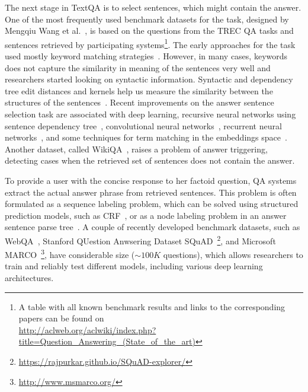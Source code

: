 The next stage in TextQA is to select sentences, which might contain the answer.
One of the most frequently used benchmark datasets for the task, designed by Mengqiu Wang et al.~\cite{wang2007jeopardy}, is based on the questions from the TREC QA tasks and sentences retrieved by participating systems\footnote{A table with all known benchmark results and links to the corresponding papers can be found on\\ \href{url}{http://aclweb.org/aclwiki/index.php?title=Question\_Answering\_(State\_of\_the\_art)}}.
The early approaches for the task used mostly keyword matching strategies~\cite{ittycheriah2001ibm,soubbotin2001patterns}.
However, in many cases, keywords does not capture the similarity in meaning of the sentences very well and researchers started looking on syntactic information.
Syntactic and dependency tree edit distances and kernels help us measure the similarity between the structures of the sentences~\cite{heilman2010tree,punyakanok2004mapping,shen2005exploring,wang2010probabilistic,yao2013answer}.
Recent improvements on the answer sentence selection task are associated with deep learning, \eg recursive neural networks using sentence dependency tree~\cite{iyyer2014neural}, convolutional neural networks~\cite{yu2014deep,santos2016attentive}, recurrent neural networks~\cite{tan2015lstm,WangN15}, and some techniques for term matching in the embeddings space~\cite{he2016pairwise,yang2016anmm,wang2017bilateral}.
Another dataset, called WikiQA~\cite{yang2015wikiqa}, raises a problem of answer triggering, \ie detecting cases when the retrieved set of sentences does not contain the answer.

To provide a user with the concise response to her factoid question, QA systems extract the actual answer phrase from retrieved sentences.
This problem is often formulated as a sequence labeling problem, which can be solved using structured prediction models, such as CRF~\cite{yao2013answer}, or as a node labeling problem in an answer sentence parse tree~\cite{malon2013answer}.
A couple of recently developed benchmark datasets, such as WebQA~\cite{li2016dataset}, Stanford QUestion Anwsering Dataset SQuAD~\cite{rajpurkar2016squad}\footnote{\href{url}{https://rajpurkar.github.io/SQuAD-explorer/}}, and Microsoft MARCO~\cite{nguyen2016ms}\footnote{\href{url}{http://www.msmarco.org/}}, have considerable size ($\sim100K$ questions), which allows researchers to train and reliably test different models, including various deep learning architectures.


